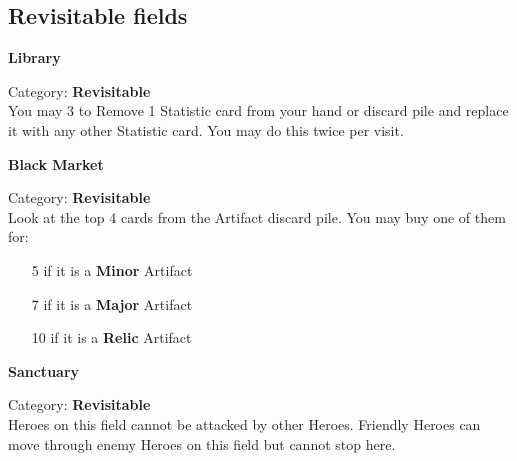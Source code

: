\begin{multicols*}{2}
\subsection*{Revisitable fields}

\begin{minipage}{\linewidth}
  \begin{center}
    \textbf{Library}\medskip
  \end{center}
  \small{Category: \textbf{Revisitable}\\
    You may 
    3 
    to Remove 1 Statistic card from   your hand or discard pile and replace it with any other Statistic card.
    You may do this twice per visit.
  }
\end{minipage}

\medskip

\begin{minipage}{\linewidth}
  \begin{center}
    \textbf{Black Market}\medskip
  \end{center}
  \small{Category: \textbf{Revisitable}\\
    Look at the top 4 cards from the Artifact discard pile.
    You may buy one of them for:
    \begin{itemize}
      \setlength\itemsep{-3pt}
      \item [5]  if it is a \textbf{Minor} Artifact
      \item [7]  if it is a \textbf{Major} Artifact
      \item [10]  if it is a \textbf{Relic} Artifact
    \end{itemize}
  }
\end{minipage}

\medskip

\begin{minipage}{\linewidth}
  \begin{center}
    \textbf{Sanctuary}\medskip
  \end{center}
  \small{Category: \textbf{Revisitable}\\
    Heroes on this field cannot be attacked by other Heroes.
    Friendly Heroes can move through enemy Heroes on this field but cannot stop here.}
\end{minipage}


\end{multicols*}
